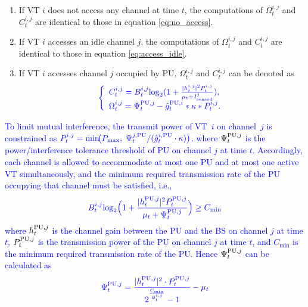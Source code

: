\documentclass[journal]{IEEEtran}
\newcommand{\revise}[1]{\textcolor{blue}{#1}}
\begin{document}
\begin{enumerate}
	\item If VT $i$ does not access any channel at time $t$, the computations of $\Omega_t^{i,j}$ and $C_t^{i,j}$ are identical to those in equation \eqref{eq:no_access}.
	\item If VT $i$ accesses an idle channel $j$, the computations of $\Omega_t^{i,j}$ and $C_t^{i,j}$ are identical to those in equation \eqref{eq:access_idle}.
	\item If VT $i$ accesses  channel $j$ occupied by PU, $\Omega _t^{i,j}$ and $C_t^{i,j}$ can be denoted as
\begin{equation}
\label{eq:access_pu_underlay_new}
{\color{blue}
\left\{ \begin{array}{l}
C_t^{i,j} = B_t^{i,j}{\log _2}(1 + \frac{{|h_t^{i,j}{|^2}P_t^{i,j}}}{{{\mu _t} + I_{{\rm{sensed}}}^j}}),\\
\Omega _t^{i,j} = \Psi _t^{{\rm{PU}},j} - \hat g_t^{{\rm{PU}},i} * \kappa  * P_t^{i,j}.
\end{array} \right.
}
\end{equation}
\end{enumerate}
 \revise{To limit mutual interference, the transmit power of VT~$i$ on channel~$j$ is constrained as ${\color{blue}P_t^{i,j} = \min\!\bigl(P_{\max},\; \Psi_t^{j,{\rm PU}} / (\hat{g}_t^{i,{\rm PU}} \cdot \kappa)\bigr)}$. where $\Psi _t^{{\rm{PU}},j}$ is the power/interference tolerance threshold of PU on channel $j$ at
 time $t$. Accordingly, each channel is allowed to accommodate at most one PU and at most one active VT simultaneously, and the minimum required transmission rate of the PU occupying that channel must be satisfied, i.e.,
}
\begin{equation}
{\color{blue}
B_t^{i,j}{\log _2}\Bigl(1 + \frac{|h_t^{{\rm{PU}},j}|^2 P_t^{{\rm{PU}},j}}{\mu_t + \Psi_t^{{\rm{PU}},j}}\Bigr) \ge C_{\min}
}
\end{equation}
\revise{where $h_t^{{\rm{PU}},j}$ is the channel gain between the PU and the BS on channel $j$ at time $t$, $P_t^{{\rm{PU}},j}$ is the transmission power of the PU on channel $j$ at time $t$,
and $C_{\min}$ is the minimum required transmission rate of the PU. Hence $\Psi _t^{{\rm{PU}},j}$ can be calculated as}
\begin{equation}
{\color{blue}
\Psi_t^{{\rm{PU}},j} = \frac{|h_t^{{\rm{PU}},j}|^2 \cdot P_t^{{\rm{PU}},j}}{2^{\frac{C_{\min}}{B_t^{i,j}}} - 1} - \mu_t
}
\end{equation}
\par
\end{document}
